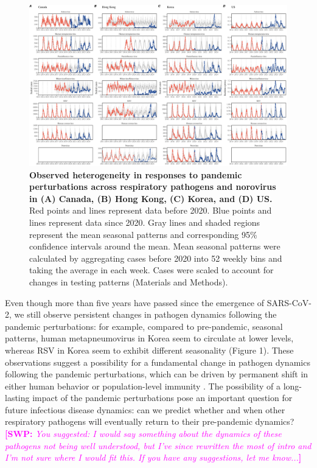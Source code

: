 \documentclass[12pt]{article}
\newcommand{\comment}{\showcomment}
\newcommand{\showcomment}[3]{\textcolor{#1}{\textbf{[#2: }\textsl{#3}\textbf{]}}}
\newcommand{\swp}[1]{\comment{magenta}{SWP}{#1}}
\begin{document}
\begin{figure}[!th]
\includegraphics[width=\textwidth]{../figure1/figure1.pdf}
\caption{
\textbf{Observed heterogeneity in responses to pandemic perturbations across respiratory pathogens and norovirus in (A) Canada, (B) Hong Kong, (C) Korea, and (D) US.}
Red points and lines represent data before 2020.
Blue points and lines represent data since 2020.
Gray lines and shaded regions represent the mean seasonal patterns and corresponding 95\% confidence intervals around the mean.
Mean seasonal patterns were calculated by aggregating cases before 2020 into 52 weekly bins and taking the average in each week.
Cases were scaled to account for changes in testing patterns (Materials and Methods).
}
\end{figure} 

Even though more than five years have passed since the emergence of SARS-CoV-2, we still observe persistent changes in pathogen dynamics following the pandemic perturbations: 
for example, compared to pre-pandemic, seasonal patterns, human metapneumovirus in Korea seem to circulate at lower levels, whereas RSV in Korea seem to exhibit different seasonality (Figure 1).
These observations suggest a possibility for a fundamental change in pathogen dynamics following the pandemic perturbations, which can be driven by permanent shift in either human behavior or population-level immunity \citep{kissler2020projecting,baker2022long}.
The possibility of a long-lasting impact of the pandemic perturbations pose an important question for future infectious disease dynamics: can we predict whether and when other respiratory pathogens will eventually return to their pre-pandemic dynamics?
\swp{You suggested: I would say something about the dynamics of these pathogens not being well understood, but I've since rewritten the most of intro and I'm not sure where I would fit this. If you have any suggestions, let me know...}
\end{document}
